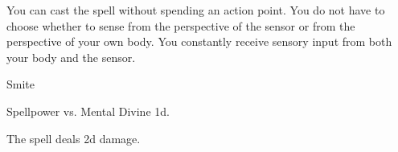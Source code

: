 You can cast the spell without spending an action point.
You do not have to choose whether to sense from the perspective of the sensor or from the perspective of your own body.
You constantly receive sensory input from both your body and the sensor.
\begin{spellsection}{Smite}
\begin{spellheader}
\end{spellheader}
\begin{spellcontent}
\begin{spelltargetinginfo}
\end{spelltargetinginfo}
\begin{spelleffects}
\begin{spellattack}{Spellpower vs. Mental}
\spellsuccess Divine  \plus1d.
\end{spellattack}
\end{spelleffects}
\end{spellcontent}
\begin{spellfooter}
\end{spellfooter}
\begin{spellsubcontent}
\begin{spellcantrip}
The spell deals \minus2d damage.
\end{spellcantrip}
\end{spellsubcontent}
\end{spellsection}
